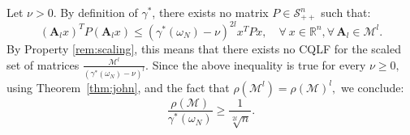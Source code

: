 \begin{pf}
Let $\nu >0$. By definition of $\gamma^*$,  there exists no matrix $P \in \mathcal{S}^n_{++}$ such that:
\begin{equation*}
(\mathbf{A}_l x)^T P (\mathbf{A}_l x) \leq (\gamma^*(\omega_N) -\nu)^{2l} x^T P x,\quad \forall\ x \in \mathbb{R}^n, \forall\, \mathbf{A}_l \in \mathcal{M}^{l}.
\end{equation*}
By Property \ref{rem:scaling}, this means that there exists no CQLF for the scaled set of matrices $\frac{\mathcal{M}^l}{(\gamma^*(\omega_N)-\nu)^l}$. Since the above inequality is true for every $\nu \geq 0,$ using Theorem~\ref{thm:john}, and the fact that $\rho(\mathcal{M}^l)=\rho(\mathcal{M})^l,$ we conclude:
\begin{equation*}
\frac{\rho(\mathcal{M})}{\gamma^*(\omega_N)} \geq \frac{1}{\sqrt[2l]{n}}.
\end{equation*}
\end{pf}